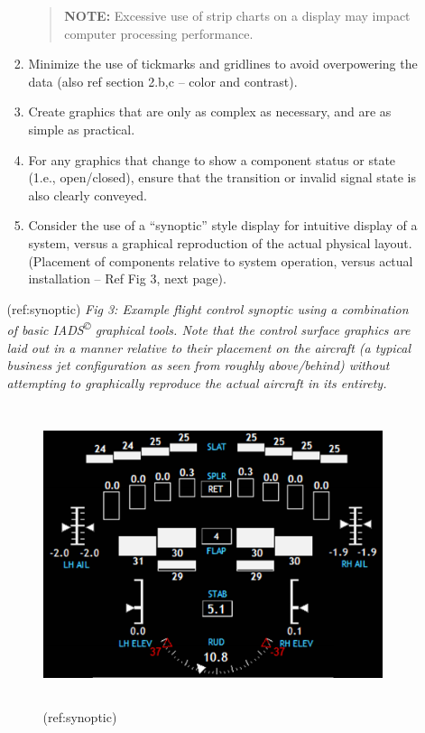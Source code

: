 \documentclass[
]{book}
\begin{document}
\begin{enumerate}
\begin{enumerate}
\begin{enumerate}
      \begin{quote}
      \textbf{NOTE:} Excessive use of strip charts on a display may impact computer processing performance.
      \end{quote}
    \item
      Minimize the use of tickmarks and gridlines to avoid overpowering the data (also ref section 2.b,c -- color and contrast).
    \item
      Create graphics that are only as complex as necessary, and are as simple as practical.
    \item
      For any graphics that change to show a component status or state (1.e., open/closed), ensure that the transition or invalid signal state is also clearly conveyed.
    \item
      Consider the use of a ``synoptic'' style display for intuitive display of a system, versus a graphical reproduction of the actual physical layout. (Placement of components relative to system operation, versus actual installation -- Ref Fig 3, next page).
    \end{enumerate}

    (ref:synoptic) \emph{Fig 3: Example flight control synoptic using a combination of basic IADS\textsuperscript{©} graphical tools. Note that the control surface graphics are laid out in a manner relative to their placement on the aircraft (a typical business jet configuration as seen from roughly above/behind) without attempting to graphically reproduce the actual aircraft in its entirety.}

    \begin{figure}
    \centering
    \includegraphics[width=4.74167in,height=3.45595in]{media/21/image3.png}
    \caption{(ref:synoptic)}
    \end{figure}


\end{enumerate}
\end{enumerate}
\end{document}
